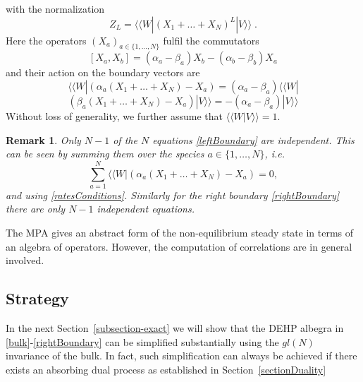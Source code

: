 \documentclass[10pt]{article}
\numberwithin{equation}{section}
\numberwithin{equation}{subsection}
\newtheorem{remark}{Remark}
\newcommand{\co}{\;,}
\newcommand{\dt}{\;.}
\begin{document}
with the normalization 
\begin{equation}
	Z_{L}= \langle \langle W|  (X_{1}+\ldots +X_{N})^{L} |V\rangle\rangle \dt
\end{equation}
Here the operators $(X_{a})_{a\in \{1,\ldots,N\}}$ fulfil the commutators
\begin{equation}\label{bulk}
	\left[X_{a},X_{b}\right]=(\alpha_{a}-\beta_{a})X_{b}-(\alpha_{b}-\beta_{b})X_{a}%
\end{equation}
and their action on the boundary vectors are
\begin{equation}\label{leftBoundary}
	 \langle \langle W|  \left(\alpha_{a}(X_{1}+\ldots+X_{N})-X_{a}\right)=(\alpha_{a}-\beta_{a}) \langle \langle W|  %
\end{equation}
\begin{equation}\label{rightBoundary}
	\left(\beta_{a}(X_{1}+\ldots+X_{N})-X_{a}\right) |V\rangle\rangle =-(\alpha_{a}-\beta_{a}) |V\rangle\rangle %
\end{equation}
Without loss of generality, we further assume that $ \langle \langle W|  V\rangle\rangle =1$. 
\begin{remark} Only $N-1$ of the $N$ equations \eqref{leftBoundary}  are independent. This can be seen by summing them over the species $a\in \{1,\ldots,N\}$, i.e.
	\begin{equation}
		\sum_{a=1}^{N}	 \langle \langle W|  \left(\alpha_{a}(X_{1}+\ldots+X_{N})-X_{a}\right)=0,%
	\end{equation}
	and using  \eqref{ratesConditions}.
 Similarly for the right boundary  \eqref{rightBoundary} there are only  $N-1$ independent equations. \end{remark} 
The MPA gives an abstract form of the non-equilibrium steady state in terms of an algebra of operators. However, the computation of  correlations are in general involved. 

\subsection{Strategy}
 In the next Section~\ref{subsection-exact} we will show that the DEHP albegra in \eqref{bulk}-\eqref{rightBoundary} can be simplified substantially using the ${gl}(N)$ invariance of the bulk. In fact, such simplification can always be achieved if 
  there exists an absorbing dual process as established in Section~\ref{sectionDuality}
 
\end{document}
